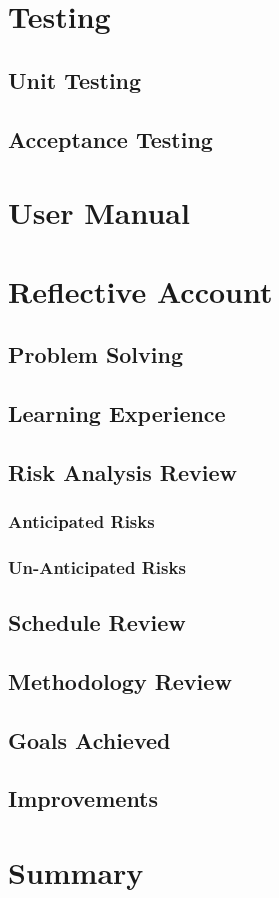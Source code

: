 \documentclass[11pt,a4paper]{report}
\begin{document}
\chapter{Testing}
\label{sec:testing}
\section{Unit Testing}
\label{sec:unit-testint}
\section{Acceptance Testing}
\label{sec:acceptance-testint}

\chapter{User Manual}
\label{sec:user-manual}

\chapter{Reflective Account}
\label{sec:reflective-account}
\section{Problem Solving}
\label{sec:problem-solving}
\section{Learning Experience}
\label{sec:learning-experience}
\section{Risk Analysis Review}
\label{sec:risk-analysis-review}
\subsection{Anticipated Risks}
\label{sec:anticipated-risks}
\subsection{Un-Anticipated Risks}
\label{sec:unanticipated-risks}
\section{Schedule Review}
\label{sec:schedule-review}
\section{Methodology Review}
\label{sec:methodology-review}
\section{Goals Achieved}
\label{sec:goals-achieved}
\section{Improvements}
\label{sec:improvements}

\chapter*{Summary}
\label{sec:summary}

\newpage



\appendix
\end{document}
